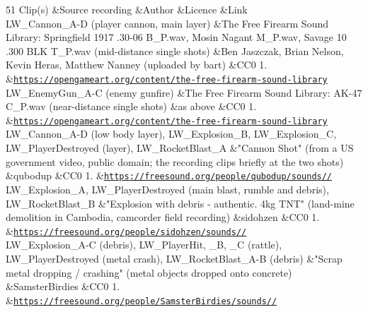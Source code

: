 \begin{DoxyTable}{5}{}{}{1}
Clip(s)  &Source recording  &Author  &Licence  &Link  \\
LW\+\_\+\+Cannon\+\_\+\+A-\/D (player cannon, main layer)  &The Free Firearm Sound Library: Springfield 1917 .30-\/06 B\+\_\+P.\+wav, Mosin Nagant M\+\_\+P.\+wav, Savage 10 .300 BLK T\+\_\+P.\+wav (mid-\/distance single shots)  &Ben Jaszczak, Brian Nelson, Kevin Heras, Matthew Nanney (uploaded by bart)  &CC0 1.  &\href{https://opengameart.org/content/the-free-firearm-sound-library}{\texttt{https:\+/\+/\+opengameart.\+org/\+content/\+the-\/free-\/firearm-\/sound-\/library}}  \\
LW\+\_\+\+Enemy\+Gun\+\_\+\+A-\/C (enemy gunfire)  &The Free Firearm Sound Library: AK-\/47 C\+\_\+P.\+wav (near-\/distance single shots)  &as above  &CC0 1.  &\href{https://opengameart.org/content/the-free-firearm-sound-library}{\texttt{https:\+/\+/\+opengameart.\+org/\+content/\+the-\/free-\/firearm-\/sound-\/library}}  \\
LW\+\_\+\+Cannon\+\_\+\+A-\/D (low body layer), LW\+\_\+\+Explosion\+\_\+B, LW\+\_\+\+Explosion\+\_\+C, LW\+\_\+\+Player\+Destroyed (layer), LW\+\_\+\+Rocket\+Blast\+\_\+A  &"{}\+Cannon Shot"{} (from a US government video, public domain; the recording clips briefly at the two shots)  &qubodup  &CC0 1.  &\href{https://freesound.org/people/qubodup/sounds/187767/}{\texttt{https:\+/\+/\+freesound.\+org/\+people/\+qubodup/\+sounds//}}  \\
LW\+\_\+\+Explosion\+\_\+A, LW\+\_\+\+Player\+Destroyed (main blast, rumble and debris), LW\+\_\+\+Rocket\+Blast\+\_\+B  &"{}\+Explosion with debris -\/ authentic. 4kg TNT"{} (land-\/mine demolition in Cambodia, camcorder field recording)  &sidohzen  &CC0 1.  &\href{https://freesound.org/people/sidohzen/sounds/165808/}{\texttt{https:\+/\+/\+freesound.\+org/\+people/\+sidohzen/\+sounds//}}  \\
LW\+\_\+\+Explosion\+\_\+\+A-\/C (debris), LW\+\_\+\+Player\+Hit, \+\_\+B, \+\_\+C (rattle), LW\+\_\+\+Player\+Destroyed (metal crash), LW\+\_\+\+Rocket\+Blast\+\_\+\+A-\/B (debris)  &"{}\+Scrap metal dropping /\+ crashing"{} (metal objects dropped onto concrete)  &Samster\+Birdies  &CC0 1.  &\href{https://freesound.org/people/SamsterBirdies/sounds/587443/}{\texttt{https:\+/\+/\+freesound.\+org/\+people/\+\+Samster\+Birdies/\+sounds//}}  \\

\end{DoxyTable}
